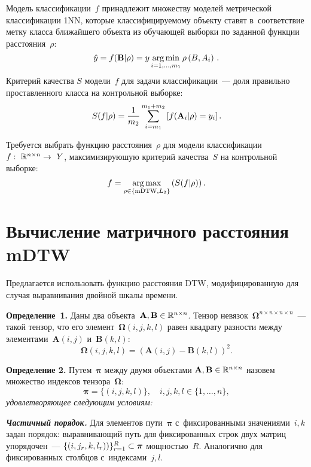 \begin{multicols}{2}
Модель классификации~$f$ принадлежит множеству моделей метрической 
классификации 1NN, которые классифицируемому объекту ставят 
в~соответствие метку класса ближайшего объекта из обучающей 
выборки по заданной функции расстояния~$\rho$:
$$ 
\hat{y} = f(\textbf{B} | \rho) = y \mathop{\mathrm{arg}\,\mathrm{min}}\limits_{i = 1,\dots, m_1} 
\rho\left(B,A_i\right)\,.
$$
Критерий качества $S$ модели~$f$ для задачи классификации~--- 
доля правильно проставленного класса на контрольной выборке:
 $$ 
 S(f | \rho) = \displaystyle\frac{\displaystyle 1\mathstrut}{\displaystyle m_2\mathstrut}\sum\limits_{i=m_1}^{m_1+m_2} 
 \left[f(\textbf{A}_i | \rho) = y_i\right].
 $$

Требуется выбрать функцию расстояния~$\rho$ для модели 
классификации~$f:~\mathbb{R}^{n\times n} \hm\rightarrow~Y$, 
максимизируюшую критерий качества~$S$ на контрольной выборке:
\begin{equation*}
f =  \mathop{\mathrm{arg}\,\mathrm{max}}\limits_{\rho \in \{\mathrm{mDTW}, L_2\}}\left(S(f | \rho)\right).
\end{equation*}

\section{Вычисление матричного расстояния mDTW}

Предлагается использовать функцию расстояния DTW, 
модифицированную для случая выравнивания двойной шкалы времени.

\smallskip

\noindent
\textbf{Определение~1.} {Даны два объекта~$\textbf{A},\textbf{B}\hm \in 
\mathbb{R}^{n\times n}$. Тензор 
невязок~$\boldsymbol{\Omega}^{n \times n \times n \times n}$~--- 
такой тензор, что его элемент~$\boldsymbol{\Omega}(i,j,k,l)$ 
равен квадрату разности между элементами~$\textbf{A}(i,j)$ и~$\textbf{B}(k,l)$:}
\begin{equation*}
\boldsymbol{\Omega}(i,j,k,l)=(\textbf{A}(i,j) - \textbf{B}(k,l))^2.
\end{equation*}

\noindent
\textbf{Определение 2.} {Путем~$\boldsymbol{\pi}$ между двумя 
объектами $\textbf{A},\textbf{B} \hm\in \mathbb{R}^{n\times n}$ 
назовем множество индексов тензора~$\boldsymbol{\Omega}$: }
$$
\boldsymbol{\pi} = \{(i,j,k,l)\},\quad i,j,k,l \in \{1,\ldots,n\} ,
$$
\textit{удовлетворяющее следующим условиям:}

{\bfseries\textit{Частичный порядок.}}
Для элементов пути~$\boldsymbol{\pi}$ с~фиксированными значениями~$i,k$ 
задан порядок: выравнивающий путь для фиксированных строк двух 
матриц упорядочен~--- $\{(i,j_r,k,l_r))\}_{r=1}^{R} \hm\subset 
\boldsymbol{\pi}$ мощностью~$R$. Аналогично для фиксированных столбцов 
с~индексами~$j,l$.


\end{multicols}
